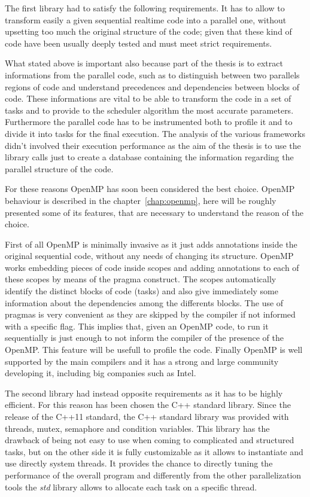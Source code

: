 \documentclass[a4paper,11pt,oneside]{book}
\begin{document}
The first library had to satisfy the following requirements. It has to allow to transform easily a given sequential real\-time code into a parallel one, without upsetting too much the original structure of the code; given that these kind of code have been usually deeply tested and must meet strict requirements.

What stated above is important also because part of the thesis is to extract informations from the parallel code, such as to distinguish between two parallels regions of code and understand precedences and dependencies between blocks of code. These informations are vital to be able to transform the code in a set of tasks and to provide to the scheduler algorithm the most accurate parameters. Furthermore the parallel code has to be instrumented both to profile it and to divide it into tasks for the final execution. The analysis of the various frameworks didn’t involved their execution performance as the aim of the thesis is to use the library calls just to create a database containing the information regarding the parallel structure of the code.  

For these reasons OpenMP has soon been considered the best choice. OpenMP behaviour is described in the chapter~\ref{chap:openmp}, here will be roughly presented some of its features, that are necessary to understand the reason of the choice.  

First of all OpenMP is minimally invasive as it just adds annotations inside the original sequential code, without any needs of changing its structure. OpenMP works embedding pieces of code inside scopes and adding annotations to each of these scopes by means of the pragma construct. The scopes automatically identify the distinct blocks of code (tasks) and also give immediately some information about the dependencies among the differents blocks. The use of pragmas is very convenient as they are skipped by the compiler if not informed with a specific flag. This implies that, given an OpenMP code, to run it sequentially is just enough to not inform the compiler of the presence of the OpenMP. This feature will be usefull to profile the code. Finally OpenMP is well supported by the main compilers and it has a strong and large community developing it, including big companies such as Intel.  

The second library had instead opposite requirements as it has to be highly efficient. For this reason has been chosen the C++ standard library. Since the release of the C++11 standard, the C++ standard library was provided with threads, mutex, semaphore and condition variables. This library has the drawback of being not easy to use when coming to complicated and structured tasks, but on the other side it is fully customizable as it allows to instantiate and use directly system threads. It provides the chance to directly tuning the performance of the overall program and differently from the other parallelization tools the \emph{std} library allows to allocate each task on a specific thread.
\end{document}

